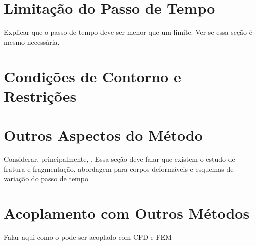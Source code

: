\section{Limitação do Passo de Tempo}

\alert{Explicar que o passo de tempo deve ser menor que um limite. Ver se essa seção é mesmo necessária.}

\section{Condições de Contorno e Restrições} \label{sec:boundary_condition}

\section{Outros Aspectos do Método}
\alert{Considerar, principalmente, . Essa seção deve falar que existem o estudo de fratura e fragmentação, abordagem para corpos deformáveis e esquemas de variação do passo de tempo}

\section{Acoplamento com Outros Métodos}
\alert{Falar aqui como o \DEM{} pode ser acoplado com CFD e FEM}
